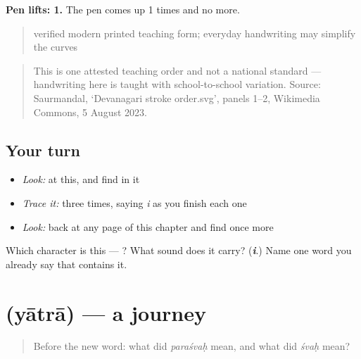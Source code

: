 \textbf{Pen lifts: 1.} The pen comes up 1 times and no more.

\begin{quote}
verified modern printed teaching form; everyday handwriting may simplify the curves
\end{quote}

\begin{quote}
This is one attested teaching order and not a national standard — handwriting here is taught with school-to-school variation. Source: Saurmandal, ‘Devanagari  stroke order.svg’, panels 1–2, Wikimedia Commons, 5 August 2023.
\end{quote}

\subsection*{Your turn}
\begin{itemize}
\raggedright
  \item \emph{Look:} at this, and find  in it
\end{itemize}

\begin{quote}
\end{quote}

\begin{itemize}
\raggedright
  \item \emph{Trace it:}  three times, saying \emph{i} as you finish each one
  \item \emph{Look:} back at any page of this chapter and find  once more
\end{itemize}

\begin{tcolorbox}[breakable,colback=teal!4,colframe=teal!35!black,title={Before you move on}]
Which character is this — ? What sound does it carry? (\emph{\textbf{i}}.) Name one word you already say that contains it.
\end{tcolorbox}
\section[\texorpdfstring{\sk{यात्रा} (yātrā)}{यात्रा (yātrā)}]{ (yātrā) — a journey}

\label{lesson:SA-C28-journey}



\begin{quote}
Before the new word: what did \emph{paraśvaḥ} mean, and what did \emph{śvaḥ} mean?
\end{quote}

